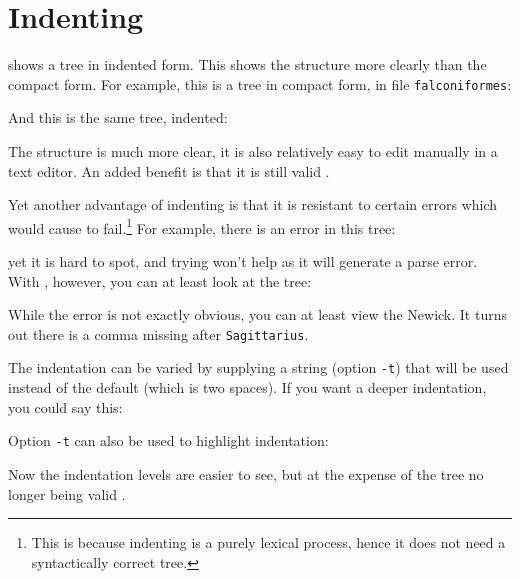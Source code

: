 
\section{Indenting}
\label{sct_indent}

\nwindent{} shows a \nw{} tree in indented form. This shows the structure more
clearly than the compact form. For example, this is a tree in compact form, in
file \texttt{falconiformes}:

And this is the same tree, indented:


The structure is much more clear, it is also relatively easy to edit manually
in a text editor. An added benefit is that it is still valid \nw. 

Yet another advantage of indenting is that it is resistant to certain errors
which would cause \display{} to fail.\footnote{This is
because indenting is a purely lexical process, hence it does not need a
syntactically correct tree.} For example, there is an error in this tree:

yet it is hard to spot, and trying \display{} won't help as it will generate a
parse error. With \nwindent{}, however, you can at least look at the tree:

While the error is not exactly obvious, you can at least view the Newick. It turns out there is a comma missing after \texttt{Sagittarius}.

The indentation can be varied by supplying a string (option \texttt{-t}) that
will be used instead of the default (which is two spaces). If you want a deeper
indentation, you could say this:


Option \texttt{-t} can also be used to highlight indentation:


Now the indentation levels are easier to see, but at the expense of the tree no
longer being valid \nw.




